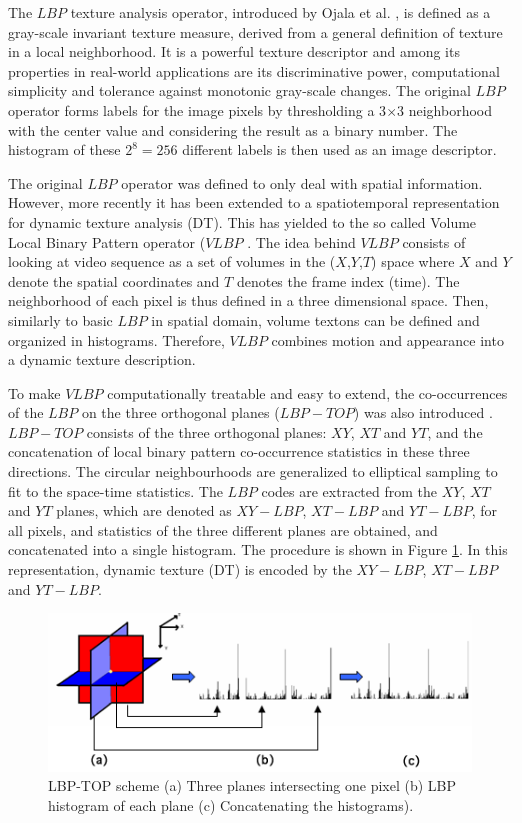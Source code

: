 The $LBP$ texture analysis operator, introduced by Ojala et al. \cite{ojala1996comparative,ojala2002multiresolution}, is defined as a gray-scale invariant  texture measure, derived from a general definition of texture in a local neighborhood. It is a powerful texture descriptor and among its properties in real-world applications are its discriminative power, computational simplicity and tolerance against monotonic gray-scale changes. The original $LBP$ operator forms labels for the image pixels by thresholding a 3$\times$3 neighborhood with the center value and considering the result as a binary number. The histogram of these $2^8=256$ different labels is then used as an image descriptor.

The original $LBP$ operator was defined to only deal with spatial information. However, more recently it has been extended to a spatiotemporal representation for dynamic texture analysis (DT). This has yielded to the so called Volume Local Binary Pattern operator ($VLBP$ \cite{zhao2007dynamic}. The idea behind $VLBP$ consists of looking at video sequence as a set of volumes in the ($X$,$Y$,$T$) space where $X$ and $Y$ denote the spatial coordinates and $T$ denotes the frame index (time). The neighborhood of each pixel is thus defined in a three dimensional space. Then, similarly to basic $LBP$ in spatial domain, volume textons can be defined and organized in histograms. Therefore, $VLBP$ combines motion and appearance into a dynamic texture description.

To make $VLBP$ computationally treatable and easy to extend, the co-occurrences of the $LBP$ on the three orthogonal planes ($LBP-TOP$) was also introduced \cite{zhao2007dynamic}. $LBP-TOP$ consists of the three orthogonal planes: $XY$, $XT$ and $YT$, and the concatenation of local binary pattern co-occurrence statistics in these three directions. The circular neighbourhoods are generalized to elliptical sampling to fit to the space-time statistics. The $LBP$ codes are extracted from the $XY$, $XT$ and $YT$ planes, which are denoted as $XY-LBP$, $XT-LBP$ and $YT-LBP$, for all pixels, and statistics of the three different planes are obtained, and concatenated into a single histogram. The procedure is shown in Figure \ref{fig:LBP-TOP_design}. In this representation, dynamic texture (DT) is encoded by the  $XY-LBP$, $XT-LBP$ and $YT-LBP$.

\begin{figure}[!htb]
\begin{center}
\includegraphics [width=0.75\linewidth] {images/proposed_countermeasure/LBP-TOP_design.png}
\caption[LBP-TOP scheme]{LBP-TOP scheme (a) Three planes intersecting one pixel (b) LBP histogram of each plane (c) Concatenating the histograms).} \label{fig:LBP-TOP_design}
\end{center}
\end{figure}


